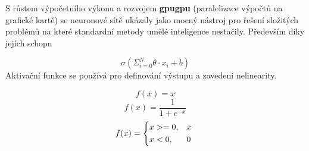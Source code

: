 S růstem výpočetního výkonu a rozvojem \textbf{gpugpu} (paralelizace výpočtů na grafické kartě) se neuronové sítě ukázaly jako mocný nástroj pro řešení složitých problémů na které standardní metody umělé inteligence nestačily. Především díky jejích schopn


$$\sigma(\Sigma_{i=0}^{N} \theta \cdot x_{i} + b)$$
Aktivační funkce se používá pro definování výstupu a zavedení nelinearity. 

$$f(x) = x$$
$$f(x) = \frac{1}{1 + e^{-x}}$$
\[ 
f(x) = 
\begin{dcases*} 
\text{$x>=0$,} & $x$ \\ 
\text{$x<0$,} & 0 
\end{dcases*} 
\]